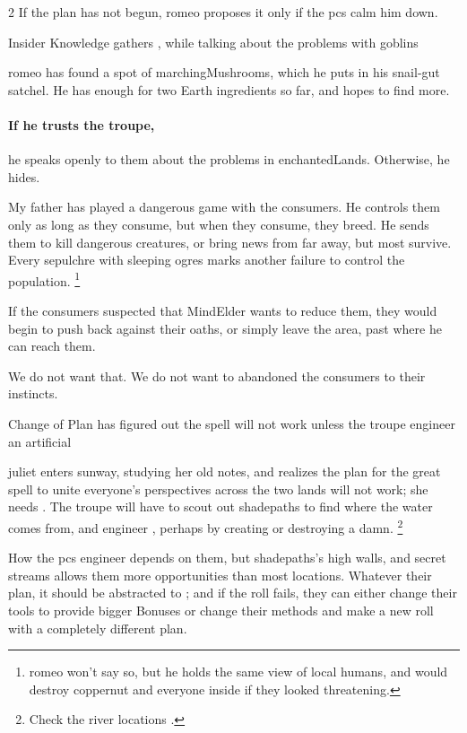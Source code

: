\begin{multicols}{2}
If the plan has not begun, \gls{romeo} proposes it only if the \glspl{pc} calm him down.

{Insider Knowledge}%
{ gathers , while talking about the problems with goblins}%

\Gls{romeo} has found a spot of \glspl{marchingMushroom}, which he puts in his snail-gut satchel.
He has enough for two Earth \glspl{ingredient} so far, and hopes to find more.

\paragraph{If he trusts the troupe,}
he speaks openly to them about the problems in \gls{enchantedLands}.
Otherwise, he hides.

\begin{speechtext}
  My father has played a dangerous game with the \glspl{consumer}.
  He controls them only as long as they consume, but when they consume, they breed.
  He sends them to kill dangerous creatures, or bring news from far away, but most survive.
  Every \gls{sepulchre} with sleeping \glspl{ogre} marks another failure to control the population.%
  \footnote{\Gls{romeo} won't say so, but he holds the same view of local humans, and would destroy \gls{coppernut} and everyone inside if they looked threatening.}

  If the \glspl{consumer} suspected that \gls{MindElder} wants to reduce them, they would begin to push back against their oaths, or simply leave the area, past where he can reach them.

  We do not want that.
  We do not want to abandoned the \glspl{consumer} to their instincts.
\end{speechtext}

{Change of Plan}%
{ has figured out the spell will not work unless the troupe engineer an artificial }%

\Gls{juliet} enters \gls{sunway}, studying her old notes, and realizes the plan for the great spell to unite everyone's perspectives across the two lands will not work; she needs .
The troupe will have to scout out \gls{shadepaths} to find where the water comes from,
and engineer , perhaps by creating or destroying a damn.%
\footnote{Check the river locations .}

How the \glspl{pc} engineer  depends on them, but \gls{shadepaths}'s high walls, and secret streams allows them more opportunities than most locations.
Whatever their plan, it should be abstracted to ; and if the roll fails, they can either change their tools to provide bigger Bonuses or change their methods and make a new roll with a completely different plan.


\end{multicols}
